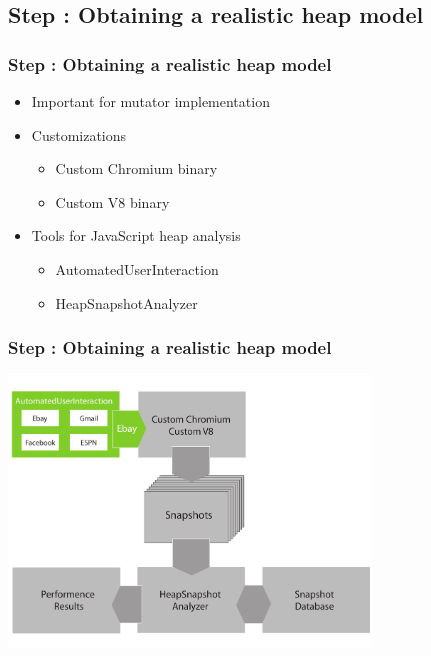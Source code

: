 \subsection{Step \theStepCounter: Obtaining a realistic heap model}
\begin{frame}
	\frametitle{Step \theStepCounter: Obtaining a realistic heap model}
	\begin{itemize}
		\item Important for mutator implementation
		\item Customizations
		\begin{itemize}
			\item Custom Chromium binary
			\item Custom V8 binary
		\end{itemize}
			
		\pause
			
		\item Tools for JavaScript heap analysis
		\begin{itemize}
			\item AutomatedUserInteraction
			\item HeapSnapshotAnalyzer
		\end{itemize}
	\end{itemize}
\end{frame}
	
\begin{frame}
	\frametitle{Step \theStepCounter: Obtaining a realistic heap model}		
	\includegraphics[width=26em]{../imgs/solution_h_1.pdf}
\end{frame}

